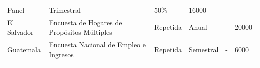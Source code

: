 \begin{longtable}[]{@{}llllll@{}}
\begin{minipage}[t]{0.06\columnwidth}
Panel\strut
\end{minipage} & \begin{minipage}[t]{0.08\columnwidth}\raggedright
Trimestral\strut
\end{minipage} & \begin{minipage}[t]{0.06\columnwidth}\raggedright
50\%\strut
\end{minipage} & \begin{minipage}[t]{0.13\columnwidth}\raggedright
16000\strut
\end{minipage}\tabularnewline
\begin{minipage}[t]{0.13\columnwidth}\raggedright
El Salvador\strut
\end{minipage} & \begin{minipage}[t]{0.38\columnwidth}\raggedright
Encuesta de Hogares de Propósitos Múltiples\strut
\end{minipage} & \begin{minipage}[t]{0.06\columnwidth}\raggedright
Repetida\strut
\end{minipage} & \begin{minipage}[t]{0.08\columnwidth}\raggedright
Anual\strut
\end{minipage} & \begin{minipage}[t]{0.06\columnwidth}\raggedright
-\strut
\end{minipage} & \begin{minipage}[t]{0.13\columnwidth}\raggedright
20000\strut
\end{minipage}\tabularnewline
\begin{minipage}[t]{0.13\columnwidth}\raggedright
Guatemala\strut
\end{minipage} & \begin{minipage}[t]{0.38\columnwidth}\raggedright
Encuesta Nacional de Empleo e Ingresos\strut
\end{minipage} & \begin{minipage}[t]{0.06\columnwidth}\raggedright
Repetida\strut
\end{minipage} & \begin{minipage}[t]{0.08\columnwidth}\raggedright
Semestral\strut
\end{minipage} & \begin{minipage}[t]{0.06\columnwidth}\raggedright
-\strut
\end{minipage} & \begin{minipage}[t]{0.13\columnwidth}\raggedright
6000\strut
\end{minipage}\tabularnewline
\begin{minipage}[t]{0.13\columnwidth}\raggedright

\end{minipage}
\end{longtable}
